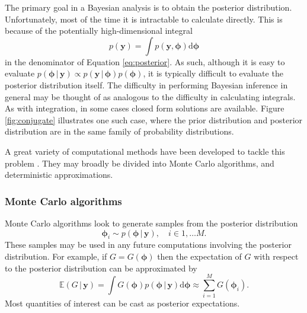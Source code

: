 \documentclass[a4paper, nobind]{templates/ociamthesis}
\begin{document}
The primary goal in a Bayesian analysis is to obtain the posterior distribution.
Unfortunately, most of the time it is intractable to calculate directly.
This is because of the potentially high-dimensional integral
\begin{equation}
p(\mathbf{y}) = \int p(\mathbf{y}, \boldsymbol{\mathbf{\phi}}) \text{d}\boldsymbol{\mathbf{\phi}}
\end{equation}
in the denominator of Equation \eqref{eq:posterior}.
As such, although it is easy to evaluate \(p(\boldsymbol{\mathbf{\phi}} \, | \, \mathbf{y}) \propto p(\mathbf{y} \, | \, \boldsymbol{\mathbf{\phi}}) p(\boldsymbol{\mathbf{\phi}})\), it is typically difficult to evaluate the posterior distribution itself.
The difficulty in performing Bayesian inference in general may be thought of as analogous to the difficulty in calculating integrals.
As with integration, in some cases closed form solutions are available.
Figure \ref{fig:conjugate} illustrates one such case, where the prior distribution and posterior distribution are in the same family of probability distributions.

A great variety of computational methods have been developed to tackle this problem \autocite{martin2023computing}.
They may broadly be divided into Monte Carlo algorithms, and deterministic approximations.

\hypertarget{monte-carlo-algorithms}{%
\subsubsection{Monte Carlo algorithms}\label{monte-carlo-algorithms}}

Monte Carlo algorithms \autocite{robert2005monte} look to generate samples from the posterior distribution
\begin{equation}
\boldsymbol{\mathbf{\phi}}_i \sim p(\boldsymbol{\mathbf{\phi}} \, | \, \mathbf{y}), \quad i \in 1, \ldots M.
\end{equation}
These samples may be used in any future computations involving the posterior distribution.
For example, if \(G = G(\boldsymbol{\mathbf{\phi}})\) then the expectation of \(G\) with respect to the posterior distribution can be approximated by
\begin{equation}
\mathbb{E}(G \, | \, \mathbf{y}) = \int G(\boldsymbol{\mathbf{\phi}}) p(\boldsymbol{\mathbf{\phi}} \, | \, \mathbf{y}) \text{d} \boldsymbol{\mathbf{\phi}} \approx \sum_{i = 1}^M G(\boldsymbol{\mathbf{\phi}}_i).
\end{equation}
Most quantities of interest can be cast as posterior expectations.
\end{document}

